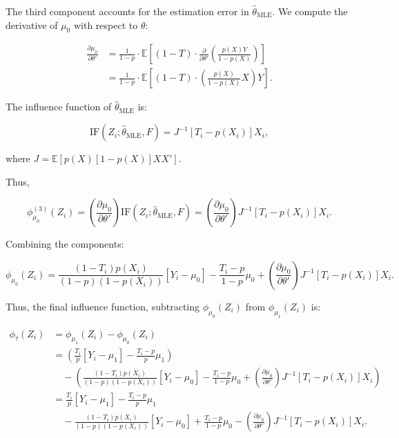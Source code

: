 \documentclass{article}
\begin{document}
The third component accounts for the estimation error in \( \hat{\theta}_{\text{MLE}} \). We compute the derivative of \( \mu_0 \) with respect to \( \theta \):

\begin{align*}
\frac{\partial \mu_0}{\partial \theta'} &= \frac{1}{1 - p} \cdot \mathbb{E}\left[ (1 - T) \cdot \frac{\partial }{\partial \theta'}\left( \frac{p(X) Y}{1 - p(X)} \right) \right] \\
&= \frac{1}{1 - p} \cdot \mathbb{E}\left[ (1 - T) \cdot \left( \frac{p(X)}{1 - p(X)} X \right) Y \right].
\end{align*}

The influence function of \( \hat{\theta}_{\text{MLE}} \) is:

\[
\text{IF}(Z_i; \hat{\theta}_{\text{MLE}}, F) = J^{-1} [T_i - p(X_i)] X_i,
\]

where \( J = \mathbb{E}\left[ p(X) [1 - p(X)] X X' \right] \).

Thus,

\[
\phi_{\mu_0}^{(3)}(Z_i) = \left( \frac{\partial \mu_0}{\partial \theta'} \right) \text{IF}(Z_i; \hat{\theta}_{\text{MLE}}, F) = \left( \frac{\partial \mu_0}{\partial \theta'} \right) J^{-1} [T_i - p(X_i)] X_i.
\]

Combining the components:

\[
\phi_{\mu_0}(Z_i) = \frac{(1 - T_i) p(X_i)}{(1 - p)(1 - p(X_i))} [Y_i - \mu_0] - \frac{T_i - p}{1 - p} \mu_0 + \left( \frac{\partial \mu_0}{\partial \theta'} \right) J^{-1} [T_i - p(X_i)] X_i.
\]


Thus, the final influence function, subtracting \( \phi_{\mu_0}(Z_i) \) from \( \phi_{\mu_1}(Z_i) \) is:

\begin{align*}
\phi_{\hat{\tau}}(Z_i) &= \phi_{\mu_1}(Z_i) - \phi_{\mu_0}(Z_i) \\
&= \left( \frac{T_i}{p} [Y_i - \mu_1] - \frac{T_i - p}{p} \mu_1 \right) \\ & \quad - \left( \frac{(1 - T_i) p(X_i)}{(1 - p)(1 - p(X_i))} [Y_i - \mu_0] - \frac{T_i - p}{1 - p} \mu_0 + \left( \frac{\partial \mu_0}{\partial \theta'} \right) J^{-1} [T_i - p(X_i)] X_i \right) \\
&= \frac{T_i}{p} [Y_i - \mu_1] - \frac{T_i - p}{p} \mu_1 \\ & \quad - \frac{(1 - T_i) p(X_i)}{(1 - p)(1 - p(X_i))} [Y_i - \mu_0] + \frac{T_i - p}{1 - p} \mu_0 - \left( \frac{\partial \mu_0}{\partial \theta'} \right) J^{-1} [T_i - p(X_i)] X_i.
\end{align*}
\end{document}
